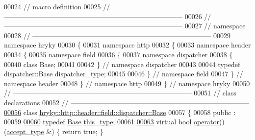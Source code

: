 \begin{DoxyCode}
00024 \textcolor{comment}{// macro definition}
00025 \textcolor{comment}{//
      ------------------------------------------------------------------------------}
00026 \textcolor{comment}{//
      ------------------------------------------------------------------------------}
00027 \textcolor{comment}{// namespace}
00028 \textcolor{comment}{//
      ------------------------------------------------------------------------------}
00029 \textcolor{keyword}{namespace }hryky
00030 \{
00031 \textcolor{keyword}{namespace }http
00032 \{
00033 \textcolor{keyword}{namespace }header
00034 \{
00035 \textcolor{keyword}{namespace }field
00036 \{
00037 \textcolor{keyword}{namespace }dispatcher
00038 \{
00040     \textcolor{keyword}{class }Base;
00041 
00042 \} \textcolor{comment}{// namespace dispatcher}
00043 
00044 \textcolor{keyword}{typedef} dispatcher::Base dispatcher\_type;
00045 
00046 \} \textcolor{comment}{// namespace field}
00047 \} \textcolor{comment}{// namespace header}
00048 \} \textcolor{comment}{// namespace http}
00049 \} \textcolor{comment}{// namespace hryky}
00050 \textcolor{comment}{//
      ------------------------------------------------------------------------------}
00051 \textcolor{comment}{// class declarations}
00052 \textcolor{comment}{//
      ------------------------------------------------------------------------------}
\hypertarget{http__header__field__dispatcher__base_8h_source_l00056}{}\hyperlink{classhryky_1_1http_1_1header_1_1field_1_1dispatcher_1_1_base}{00056} \textcolor{comment}{}\textcolor{keyword}{class }\hyperlink{classhryky_1_1http_1_1header_1_1field_1_1dispatcher_1_1_base}{hryky::http::header::field::dispatcher::Base}
00057 \{
00058 \textcolor{keyword}{public} :
00059 
\hypertarget{http__header__field__dispatcher__base_8h_source_l00060}{}\hyperlink{classhryky_1_1http_1_1header_1_1field_1_1dispatcher_1_1_base_ad3afdc056a3d7e53ca6eb6074d84583b}{00060}     \textcolor{keyword}{typedef} \hyperlink{classhryky_1_1http_1_1header_1_1field_1_1dispatcher_1_1_base}{Base} \hyperlink{classhryky_1_1http_1_1header_1_1field_1_1dispatcher_1_1_base_ad3afdc056a3d7e53ca6eb6074d84583b}{this_type};
00061 
\hypertarget{http__header__field__dispatcher__base_8h_source_l00063}{}\hyperlink{classhryky_1_1http_1_1header_1_1field_1_1dispatcher_1_1_base_af42a7955735a7082192707cf0a9f2a78}{00063}     \textcolor{keyword}{virtual} \textcolor{keywordtype}{bool} \hyperlink{classhryky_1_1http_1_1header_1_1field_1_1dispatcher_1_1_base_af42a7955735a7082192707cf0a9f2a78}{operator()}(\hyperlink{classhryky_1_1http_1_1header_1_1accept_1_1_entity}{accept_type} &) \{ \textcolor{keywordflow}{return} \textcolor{keyword}{true}; \}

\end{DoxyCode}
